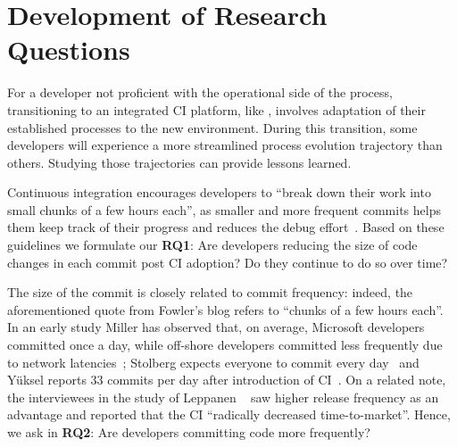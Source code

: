 
\section{Development of Research Questions}
\label{sec:background}

For a developer not proficient with the operational side of the process, 
transitioning to an integrated CI platform, like \Tvis, involves adaptation 
of their established processes to the new environment. 
During this transition, some developers will experience a more streamlined 
process evolution trajectory than others. 
Studying those trajectories can provide lessons learned.


%

Continuous integration encourages developers to ``break down their work 
into small chunks of a few hours each'', as smaller and more frequent commits 
helps them keep track of their progress and reduces the debug effort~\cite{Fowler,Duvall}. 
Based on these guidelines we formulate our \textbf{RQ1}: 
Are developers reducing the size of code changes in each commit post CI adoption? 
Do they continue to do so over time?

The size of the commit is closely related to commit frequency: indeed, the 
aforementioned quote from Fowler's blog refers to ``chunks of a few hours each''. 
In an early study Miller has observed that, on average, Microsoft developers 
committed once a day, while off-shore developers committed less frequently 
due to network latencies~\cite{Miller}; Stolberg expects everyone to commit every 
day~\cite{Stolberg} and Y\"{u}ksel reports 33 commits per day after introduction 
of CI~\cite{Yuksel}. On a related note, the interviewees in the study of 
Leppanen \etal~\cite{Leppanen2015} saw higher release frequency as an
advantage and reported that the CI ``radically decreased time-to-market''. 
Hence, we ask in \textbf{RQ2}: Are developers committing code more frequently?


